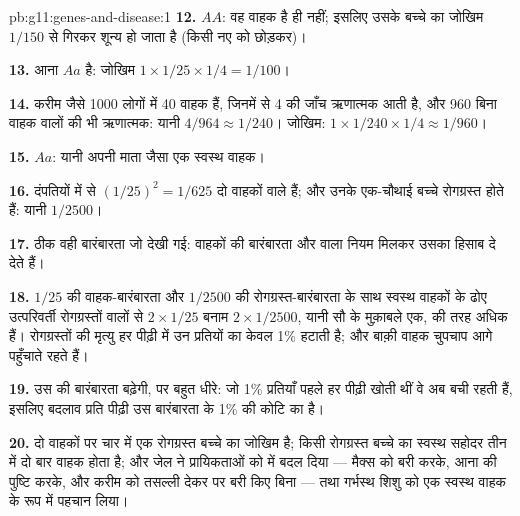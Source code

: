 \begin{solution}{pb:g11:genes-and-disease:1}
\textbf{12.} $AA$: वह वाहक है ही नहीं; इसलिए उसके बच्चे का जोखिम
$1/150$ से गिरकर शून्य हो जाता है (किसी नए  को छोड़कर)।

\textbf{13.} आना $Aa$ है: जोखिम $1 \times 1/25 \times 1/4 = 1/100$।

\textbf{14.} करीम जैसे 1000 लोगों में 40 वाहक हैं, जिनमें से 4 की जाँच
ऋणात्मक आती है, और 960 बिना वाहक वालों की भी ऋणात्मक: यानी $4/964 \approx
1/240$। जोखिम: $1 \times 1/240 \times 1/4 \approx 1/960$।

\textbf{15.} $Aa$: यानी अपनी माता जैसा एक स्वस्थ वाहक।

\textbf{16.} दंपतियों में से $(1/25)^2 = 1/625$ दो वाहकों वाले हैं; और
उनके एक-चौथाई बच्चे रोगग्रस्त होते हैं: यानी $1/2500$।

\textbf{17.} ठीक वही बारंबारता जो देखी गई: वाहकों की बारंबारता और 
वाला नियम मिलकर उसका हिसाब दे देते हैं।

\textbf{18.} $1/25$ की वाहक-बारंबारता और $1/2500$ की रोगग्रस्त-बारंबारता
के साथ स्वस्थ वाहकों के ढोए उत्परिवर्ती  रोगग्रस्तों वालों से
$2 \times 1/25$ बनाम $2 \times
1/2500$, यानी सौ के मुक़ाबले एक, की तरह अधिक हैं। रोगग्रस्तों की मृत्यु हर
पीढ़ी में उन प्रतियों का केवल 1\% हटाती है; और बाक़ी वाहक चुपचाप आगे
पहुँचाते रहते हैं।

\textbf{19.} उस  की बारंबारता बढ़ेगी, पर बहुत धीरे: जो 1\% प्रतियाँ
पहले हर पीढ़ी खोती थीं वे अब बची रहती हैं, इसलिए बदलाव प्रति पीढ़ी उस
बारंबारता के 1\% की कोटि का है।

\textbf{20.} दो वाहकों पर चार में एक रोगग्रस्त बच्चे का जोखिम है; किसी
रोगग्रस्त बच्चे का स्वस्थ सहोदर तीन में दो बार वाहक होता है; और जेल ने
प्रायिकताओं को  में बदल दिया --- मैक्स को बरी करके, आना की
पुष्टि करके, और करीम को तसल्ली देकर पर बरी किए बिना --- तथा गर्भस्थ शिशु
को एक स्वस्थ वाहक के रूप में पहचान लिया।
\end{solution}

